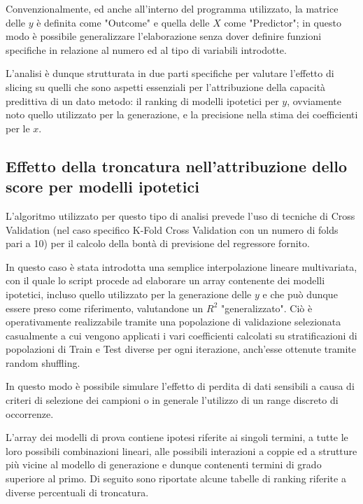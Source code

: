 \documentclass[12pt,openright,twoside,a4paper]{book}
\begin{document}
Convenzionalmente, ed anche all'interno del programma utilizzato, la matrice delle $y$ è definita come "Outcome" e quella delle $X$ come "Predictor"; in questo modo è possibile generalizzare l'elaborazione senza dover definire funzioni specifiche in relazione al numero ed al tipo di variabili introdotte.

L'analisi è dunque strutturata in due parti specifiche per valutare l'effetto di slicing su quelli che sono aspetti essenziali per l'attribuzione della capacità predittiva di un dato metodo: il ranking di modelli ipotetici per $y$, ovviamente noto quello utilizzato per la generazione, e la precisione nella stima dei coefficienti per  le $x$.

\subsection{Effetto della troncatura nell'attribuzione dello score per modelli ipotetici}
L'algoritmo utilizzato per questo tipo di analisi prevede l'uso di tecniche di Cross Validation (nel caso specifico K-Fold Cross Validation con un numero di folds pari a 10) per il calcolo della bontà di previsione del regressore fornito.

In questo caso è stata introdotta una semplice interpolazione lineare multivariata, con il quale lo script procede ad elaborare un array contenente dei modelli ipotetici, incluso quello utilizzato per la generazione delle $y$ e che può dunque essere preso come riferimento, valutandone un $R^2$ "generalizzato".
Ciò è operativamente realizzabile tramite una popolazione di validazione selezionata casualmente a cui vengono applicati i vari coefficienti calcolati su stratificazioni di popolazioni di Train e Test diverse per ogni iterazione, anch'esse ottenute tramite random shuffling.

In questo modo è possibile simulare l'effetto di perdita di dati sensibili a causa di criteri di selezione dei campioni o in generale l'utilizzo di un range discreto di occorrenze.

L'array dei modelli di prova contiene ipotesi riferite ai singoli termini, a tutte le loro possibili combinazioni lineari, alle possibili interazioni a coppie ed a strutture più vicine al modello di generazione e dunque contenenti termini di grado superiore al primo.
Di seguito sono riportate alcune tabelle di ranking riferite a diverse percentuali di troncatura.
\end{document}
